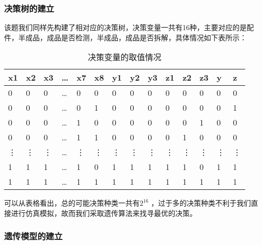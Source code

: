 \documentclass[utf8]{ctexart} %
\begin{document}
				\subsubsection{决策树的建立}
		该题我们同样先构建了相对应的决策树，决策变量一共有16种，主要对应的是配件，半成品，成品是否检测，半成品，成品是否拆解，具体情况如下表所示：
		\begin{table}[H]
			\centering
			\caption{决策变量的取值情况}
			\label{tab:decision_variables_full}
			\begin{tabular}{p{0.05\textwidth}p{}p{}p{}p{}p{}p{}p{}p{}p{}p{}p{}p{}p{}}
				\toprule
				\textbf{x1} & \textbf{x2} & \textbf{x3} & \multicolumn{1}{c}{\dots} & \textbf{x7} & \textbf{x8} & \textbf{y1} & \textbf{y2} & \textbf{y3} & \textbf{z1} & \textbf{z2} & \textbf{z3} & \textbf{y} & \textbf{z} \\
				\midrule
				0 & 0 & 0 & \dots & 0 & 0 & 0 & 0 & 0 & 0 & 0 & 0 & 0 & 0 \\
				0 & 0 & 0 & \dots & 0 & 1 & 0 & 0 & 0 & 0 & 0 & 0 & 0 & 1 \\
				0 & 0 & 0 & \dots & 1 & 0 & 0 & 0 & 0 & 0 & 0 & 1 & 0 & 0 \\
				0 & 0 & 0 & \dots & 1 & 1 & 0 & 0 & 0 & 0 & 1 & 0 & 0 & 0 \\
				\vdots & \vdots & \vdots & \dots & \vdots & \vdots & \vdots & \vdots & \vdots & \vdots & \vdots & \vdots & \vdots & \vdots \\
				1 & 1 & 1 & \dots & 1 & 0 & 1 & 1 & 1 & 1 & 1 & 0 & 1 & 1 \\
				1 & 1 & 1 & \dots & 1 & 1 & 1 & 1 & 1 & 1 & 1 & 1 & 1 & 1 \\
				\bottomrule
			\end{tabular}
		\end{table}
		可以从表格看出，总的可能决策种类一共有\( 2^{16} \) ，过于多的决策种类不利于我们直接进行仿真模拟，故而我们采取遗传算法来找寻最优的决策。
		\subsubsection{遗传模型的建立}
		
\end{document}
